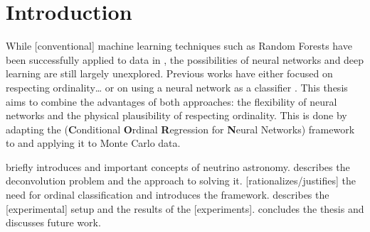 \chapter{Introduction}
While [conventional] machine learning techniques
  such as Random Forests
have been successfully applied to \icecube{} data in \dsea{},
the possibilities of neural networks and deep learning are still largely unexplored. %
%
Previous works have either
  focused on respecting ordinality… \cite{dsea_jan}
  or on using a neural network as a classifier \cite{dsea_samuel}.
This thesis aims to combine the advantages of both approaches:
  the flexibility of neural networks
  and the physical plausibility of respecting ordinality.
This is done by adapting the
\corn{} (\textbf{C}onditional \textbf{O}rdinal \textbf{R}egression for \textbf{N}eural Networks) \cite{corn} framework
to \dsea{}
and applying it to \icecube{} Monte Carlo data.

 briefly introduces \icecube{} and important concepts of neutrino astronomy.
 describes the deconvolution problem and the \dsea{} approach to solving it.
 [rationalizes/justifies] the need for ordinal classification and introduces the \corn{} framework.
 describes the [experimental] setup and the results of the [experiments].
 concludes the thesis and discusses future work.

\blindtext[2]
